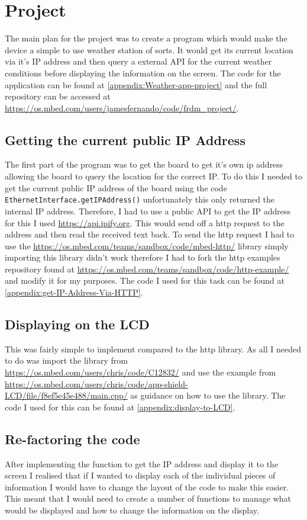 \documentclass[a4paper,12pt]{scrartcl}
\begin{document}
	\section{Project}
	{
		The main plan for the project was to create a program which would make the device a simple to use weather station of sorts. It would get its current location via it's IP address and then query a external API for the current weather conditions before displaying the information on the screen. The code for the application can be found at \cref{appendix:Weather-app-project} and the full repository can be accessed at \url{https://os.mbed.com/users/jamesfernando/code/frdm_project/}.
		\subsection{Getting the current public IP Address}
		{
			The first part of the program was to get the board to get it's own ip address allowing the board to query the location for the correct IP. To do this I needed to get the current public IP address of the board using the code \lstinline|EthernetInterface.getIPAddress()| unfortunately this only returned the internal IP address. Therefore, I had to use a public API to get the IP address for this I used \url{https://api.ipify.org}\cite{Degges}. This would send off a http request to the address and then read the received text back. To send the http request I had to use the \url{https://os.mbed.com/teams/sandbox/code/mbed-http/} library simply importing this library didn't work therefore I had to fork the http examples repository found at \url{https://os.mbed.com/teams/sandbox/code/http-example/} and modify it for my purposes. The code I used for this task can be found at \cref{appendix:get-IP-Address-Via-HTTP}.
		}
		\subsection{Displaying on the LCD}
		{
			This was fairly simple to implement compared to the http library. As all I needed to do was import the library from \url{https://os.mbed.com/users/chris/code/C12832/} and use the example from \url{https://os.mbed.com/users/chris/code/app-shield-LCD/file/f8ef5e45e488/main.cpp/} as guidance on how to use the library. The code I used for this can be found at \cref{appendix:display-to-LCD}.
		}
		\subsection{Re-factoring the code}
		{
			After implementing the function to get the IP address and display it to the screen I realised that if I wanted to display each of the individual pieces of information I would have to change the layout of the code to make this easier. This meant that I would need to create a number of functions to manage what would be displayed and how to change the information on the display.
		}
}
\end{document}
